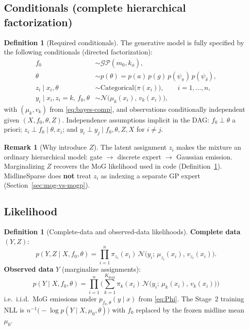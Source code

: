 \documentclass[11pt,a4paper]{article}
\theoremstyle{plain}
\theoremstyle{definition}
\newtheorem{definition}[theorem]{Definition}
\newtheorem{remark}[theorem]{Remark}
\theoremstyle{remark}
\newcommand{\Ncal}{\mathcal{N}}
\newcommand{\GP}{\mathcal{GP}}
\newcommand{\tht}{\theta}
\newcommand{\Kmax}{K_{\max}}
\begin{document}
\subsection{Conditionals (complete hierarchical factorization)}
\begin{definition}[Required conditionals]
\label{def:bayes-cond}
The generative model is fully specified by the following conditionals
(directed factorization):
\begin{align}
  f_0
  &\sim
  \GP(m_0,k_\phi),
  \label{eq:cond-f0}
  \\
  \tht
  &\sim
  p(\tht)
  =
  p(a)\,p(g)\,p(\psi_\pi)\,p(\psi_\delta),
  \label{eq:cond-tht}
  \\
  z_i\mid x_i,\tht
  &\sim
  \mathrm{Categorical}\bigl(\pi(x_i)\bigr),
  \qquad
  i=1,\ldots,n,
  \label{eq:cond-z}
  \\
  y_i\mid x_i,z_i=k,\,f_0,\tht
  &\sim
  \Ncal\!\bigl(\mu_k(x_i),\,v_k(x_i)\bigr),
  \label{eq:cond-y}
\end{align}
with \((\mu_k,v_k)\) from \eqref{eq:bayes-comp}, and observations conditionally
independent given \((X,f_0,\tht,Z)\).
Independence assumptions implicit in the DAG:
\(f_0\perp\tht\) a priori; \(z_i\perp f_0\mid\tht,x_i\); and
\(y_i\perp y_j\mid f_0,\tht,Z,X\) for \(i\neq j\).
\end{definition}

\begin{remark}[Why introduce \(Z\)]
The latent assignment \(z_i\) makes the mixture an ordinary hierarchical model:
gate \(\to\) discrete expert \(\to\) Gaussian emission.
Marginalizing \(Z\) recovers the MoG likelihood used in code
(Definition~\ref{def:bayes-lik}).
MidlineSparse does \textbf{not} treat \(z_i\) as indexing a separate GP expert
(Section~\ref{sec:mog-vs-mogp}).
\end{remark}

\subsection{Likelihood}
\begin{definition}[Complete-data and observed-data likelihoods]
\label{def:bayes-lik}
\textbf{Complete data} \((Y,Z)\):
\begin{equation}
  p(Y,Z\mid X,f_0,\tht)
  =
  \prod_{i=1}^n
  \pi_{z_i}(x_i)\,
  \Ncal\!\bigl(y_i;\,\mu_{z_i}(x_i),\,v_{z_i}(x_i)\bigr).
  \label{eq:bayes-complete-lik}
\end{equation}
\textbf{Observed data} \(Y\) (marginalize assignments):
\begin{equation}
  \boxed{
  p(Y\mid X,f_0,\tht)
  =
  \prod_{i=1}^n
  \Biggl(
    \sum_{k=1}^{\Kmax}
    \pi_k(x_i)\,
    \Ncal\!\bigl(y_i;\,\mu_k(x_i),\,v_k(x_i)\bigr)
  \Biggr)
  }
  \label{eq:bayes-obs-lik}
\end{equation}
i.e.\ i.i.d.\ MoG emissions under \(p_{f_0,\tht}(y\mid x)\) from \eqref{eq:Phi}.
The Stage~2 training NLL is
\(n^{-1}\bigl(-\log p(Y\mid X,\mu_0,\tht)\bigr)\) with \(f_0\) replaced by the
frozen midline mean \(\mu_0\).
\end{definition}
\end{document}
